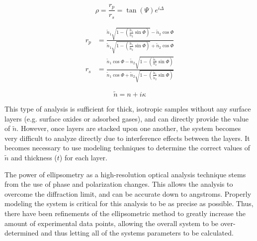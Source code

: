 \begin{equation}
 \label{eq:ellipsometry}
 \displaystyle
	\rho = \frac{r_{p}}{r_{s}} = \tan(\Psi)e^{i\Delta}
\end{equation}

\begin{subequations}
\label{eq:fresnel}
\begin{align}
	r_{p} &= \frac{\tilde{n}_{1}\sqrt{1- \left(\frac{\tilde{n}_{1}}{\tilde{n}_{2}}\sin\Phi\right)} - \tilde{n}_{2}%
			\cos\Phi}{\tilde{n}_{1}\sqrt{1- \left(\frac{\tilde{n}_{1}}{\tilde{n}_{2}}\sin\Phi\right)} + %
			\tilde{n}_{2}\cos\Phi} \\
        	r_{s} &= \frac{\tilde{n}_{1}\cos\Phi - \tilde{n}_{2}\sqrt{1- \left(\frac{\tilde{n}_{1}}{n_{2}}\sin\Phi\right)}}%
			{\tilde{n}_{1}\cos\Phi + \tilde{n}_{2}\sqrt{1- \left(\frac{\tilde{n}_{1}}{\tilde{n}_{2}}\sin\Phi\right)}}
\end{align}
\end{subequations}

\begin{equation}
 \label{eq:complexindex}
 \displaystyle
	\tilde{n} = n + i\kappa
\end{equation}

This type of analysis is sufficient for thick, isotropic samples without any surface layers (e.g. surface oxides or adsorbed gases), and can directly provide the value of $\tilde{n}$. However, once layers are stacked upon one another, the system becomes very difficult to analyze directly due to interference effects between the layers. It becomes necessary to use modeling techniques to determine the correct values of $\tilde{n}$ and thickness ($t$) for each layer.\cite{schubert_infrared_2005,tompkins_spectroscopic_1999} 

The power of ellipsometry as a high-resolution optical analysis technique stems from the use of phase and polarization changes. This allows the analysis to overcome the diffraction limit, and can be accurate down to angstroms. Properly modeling the system is critical for this analysis to be as precise as possible. Thus, there have been refinements of the ellipsometric method to greatly increase the amount of experimental data points, allowing the overall system to be over-determined and thus letting all of the systems parameters to be calculated. 
	
